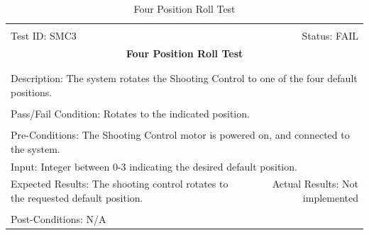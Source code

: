 \documentclass[11pt]{article}
\begin{document}
\begin{center}
\begin{table}[H]
\begin{tabular}{|l r|}\hline&\\[-2mm]
	Test ID: SMC3	&Status: FAIL\\[-3mm]
	\multicolumn{2}{|c|}{\textbf{\large{Four Position Roll Test}}}\\&\\\hline&\\[-3mm]
	\multicolumn{2}{|p{\textwidth}|}{Description: The system rotates the Shooting Control to one of the four default positions.}\\[1mm]\hline&\\[-3mm]
	\multicolumn{2}{|p{\textwidth}|}{Pass/Fail Condition: Rotates to the indicated position.}\\[1mm]\hline&\\[-3mm]
	\multicolumn{2}{|p{\textwidth}|}{Pre-Conditions: The Shooting Control motor is powered on, and connected to the system.
}\\[4mm]
	\multicolumn{2}{|p{\textwidth}|}{Input: Integer between 0-3 indicating the desired default position.}\\[2mm]\hline
	\multicolumn{1}{|p{0.49\textwidth}}{Expected Results: The shooting control rotates to the requested default position.
}	&\multicolumn{1}{|p{0.45\textwidth}|}{Actual Results: Not implemented}\\\hline&\\[-3mm]
	\multicolumn{2}{|p{\textwidth}|}{Post-Conditions: N/A}\\\hline
\end{tabular}
\caption{Four Position Roll Test}
\end{table}
\end{center}
\end{document}
